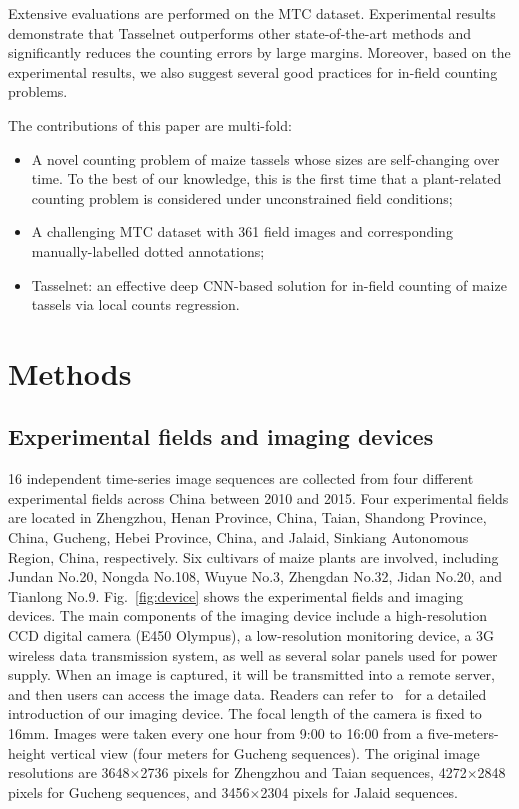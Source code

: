 \documentclass[twocolumn]{bmcart}%
\begin{document}
Extensive evaluations are performed on the MTC dataset. Experimental results demonstrate that Tasselnet outperforms other state-of-the-art methods and significantly reduces the counting errors by large margins. Moreover, based on the experimental results, we also suggest several good practices for in-field counting problems.

The contributions of this paper are multi-fold:
\begin{itemize}
	\item A novel counting problem of maize tassels whose sizes are self-changing over time. To the best of our knowledge, this is the first time that a plant-related counting problem is considered under unconstrained field conditions;
	\item A challenging MTC dataset with 361 field images and corresponding manually-labelled dotted annotations;
	\item Tasselnet: an effective deep CNN-based solution for in-field counting of maize tassels via local counts regression.
\end{itemize}

\section*{Methods}

\subsection*{Experimental fields and imaging devices}
16 independent time-series image sequences are collected from four different experimental fields across China between 2010 and 2015. Four experimental fields are located in Zhengzhou, Henan Province, China, Taian, Shandong Province, China, Gucheng, Hebei Province, China, and Jalaid, Sinkiang Autonomous Region, China, respectively. Six cultivars of maize plants are involved, including Jundan No.20, Nongda No.108, Wuyue No.3, Zhengdan No.32, Jidan No.20, and Tianlong No.9. Fig.~\ref{fig:device} shows the experimental fields and imaging devices. The main components of the imaging device include a high-resolution CCD digital camera (E450 Olympus), a low-resolution monitoring device, a 3G wireless data transmission system, as well as several solar panels used for power supply. When an image is captured, it will be transmitted into a remote server, and then users can access the image data. Readers can refer to~\cite{lu2016toward} for a detailed introduction of our imaging device. The focal length of the camera is fixed to 16mm. Images were taken every one hour from 9:00 to 16:00 from a
five-meters-height vertical view (four meters for Gucheng sequences). The original image resolutions are 3648$\times$2736 pixels for Zhengzhou and Taian sequences, 4272$\times$2848 pixels for Gucheng sequences, and 3456$\times$2304 pixels for Jalaid sequences.
\end{document}
